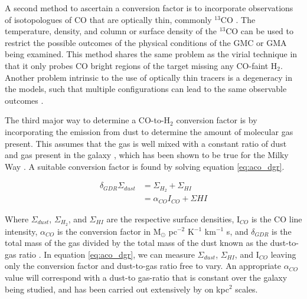 A second method to ascertain a conversion factor is to incorporate observations of isotopologues of CO that are optically thin, commonly $^{13}$CO \citep{bolatto2013}.   The temperature, density, and column or surface density of the $^{13}$CO can be used to restrict the possible outcomes of the physical conditions of the GMC or GMA being examined.  This method shares the same problem as the virial technique in that it only probes CO bright regions of the target missing any CO-faint H$_2$\citep{bolatto2013}.  Another problem intrinsic to the use of optically thin tracers is a degeneracy in the models, such that multiple configurations can lead to the same observable outcomes \citep{bolatto2013}.

The third major way to determine a CO-to-H$_2$ conversion factor is by incorporating the emission from dust to determine the amount of molecular gas present.  This assumes that the gas is well mixed with a constant ratio of dust and gas present in the galaxy \citep{leroy2011}, which has been shown to be true for the Milky Way \citep{boulanger1996}.  A suitable conversion factor is found by solving equation \ref{eq:aco_dgr}.

\begin{equation}\label{eq:aco_dgr}
  \begin{split}
    \delta_{GDR}\Sigma_{dust} & = \Sigma_{H_2} + \Sigma_{HI} \\
    						  & = \alpha_{CO} I_{CO} + \Sigma{HI}
  \end{split}
\end{equation}

Where $\Sigma_{dust}$, $\Sigma_{H_2}$, and $\Sigma_{HI}$ are the respective surface densities, I$_{CO}$ is the CO line intensity, $\alpha_{CO}$ is the conversion factor in M$_\odot$ pc$^{-2}$ K$^{-1}$ km$^{-1}$ s, and $\delta_{GDR}$ is the total mass of the gas divided by the total mass of the dust known as the dust-to-gas ratio \citep{leroy2011,sandstrom2013}.  In equation \ref{eq:aco_dgr}, we can measure $\Sigma_{dust}$, $\Sigma_{HI}$, and I$_{CO}$ leaving only the conversion factor and dust-to-gas ratio free to vary.  An appropriate $\alpha_{CO}$ value will correspond with a dust-to gas-ratio that is constant over the galaxy being studied, and has been carried out extensively by \cite{sandstrom2013} on kpc$^2$ scales.

